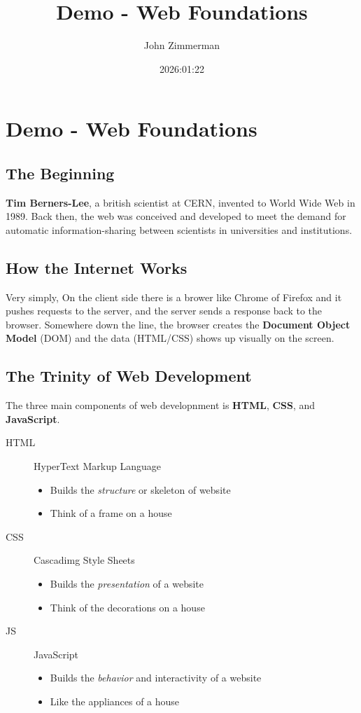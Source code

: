 \documentclass[11pt]{article}
\author{John Zimmerman}
\date{2026:01:22}
\title{Demo - Web Foundations}
\begin{document}
\maketitle
\tableofcontents

\section{Demo - Web Foundations}
\label{sec:org3c4655f}

\subsection{The Beginning}
\label{sec:orge9c3088}

\textbf{Tim Berners-Lee}, a british scientist at CERN, invented to World Wide Web in 1989. Back then, the web was conceived and developed to meet the demand for automatic information-sharing between scientists in universities and institutions.
\subsection{How the Internet Works}
\label{sec:orgf5e9aa7}

Very simply, On the client side there is a brower like Chrome of Firefox and it pushes requests to the server, and the server sends a response back to the browser. Somewhere down the line, the browser creates the \textbf{Document Object Model} (DOM) and the data (HTML/CSS) shows up visually on the screen.
\subsection{The Trinity of Web Development}
\label{sec:org9ed8df5}

The three main components of web developnment is \textbf{HTML}, \textbf{CSS}, and \textbf{JavaScript}.

\begin{description}
\item[{HTML}] HyperText Markup Language
\begin{itemize}
\item Builds the \emph{structure} or skeleton of website
\item Think of a frame on a house
\end{itemize}
\item[{CSS}] Cascadimg Style Sheets
\begin{itemize}
\item Builds the \emph{presentation} of a website
\item Think of the decorations on a house
\end{itemize}
\item[{JS}] JavaScript
\begin{itemize}
\item Builds the \emph{behavior} and interactivity of a website
\item Like the appliances of a house
\end{itemize}
\end{description}
\end{document}
